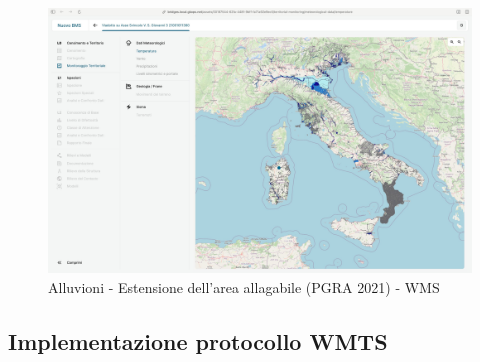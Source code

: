 \begin{figure}[htbp]
      \centering
      \includegraphics[width=1\textwidth]{Tesi/images/Capitolo5/italiaAlluvioni.jpg}
      \caption{Alluvioni - Estensione dell’area allagabile (PGRA 2021) - WMS}
      \label{fig:italiaAlluvioni}
\end{figure}

\subsection{Implementazione protocollo WMTS}


